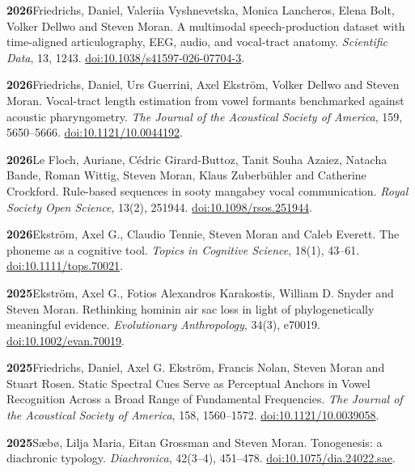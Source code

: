 \documentclass[11pt]{article}
\newcommand{\hangpara}{
 \setlength{\parindent}{0in} %
 \hangindent=0.42in %
}
\begin{document}
\vskip 6pt
\hangpara
{\bf 2026}\hspace{1ex}Friedrichs, Daniel, Valeriia Vyshnevetska, Monica Lancheros, Elena Bolt, Volker Dellwo and Steven Moran. A multimodal speech-production dataset with time-aligned articulography, EEG, audio, and vocal-tract anatomy. \textit{Scientific Data}, 13, 1243. \href{https://doi.org/10.1038/s41597-026-07704-3}{doi:10.1038/s41597-026-07704-3}.

\vskip 6pt
\hangpara
{\bf 2026}\hspace{1ex}Friedrichs, Daniel, Urs Guerrini, Axel Ekström, Volker Dellwo and Steven Moran. Vocal-tract length estimation from vowel formants benchmarked against acoustic pharyngometry. \textit{The Journal of the Acoustical Society of America}, 159, 5650--5666. \href{https://doi.org/10.1121/10.0044192}{doi:10.1121/10.0044192}.

\vskip 6pt
\hangpara
{\bf 2026}\hspace{1ex}Le Floch, Auriane, Cédric Girard-Buttoz, Tanit Souha Azaiez, Natacha Bande, Roman Wittig, Steven Moran, Klaus Zuberbühler and Catherine Crockford. Rule-based sequences in sooty mangabey vocal communication. \textit{Royal Society Open Science}, 13(2), 251944. \href{https://doi.org/10.1098/rsos.251944}{doi:10.1098/\allowbreak rsos.251944}.

\vskip 6pt
\hangpara
{\bf 2026}\hspace{1ex}Ekström, Axel G., Claudio Tennie, Steven Moran and Caleb Everett. The phoneme as a cognitive tool. \textit{Topics in Cognitive Science}, 18(1), 43--61. \href{https://doi.org/10.1111/tops.70021}{doi:10.1111/tops.70021}.

\vskip 6pt
\hangpara
{\bf 2025}\hspace{1ex}Ekström, Axel G., Fotios Alexandros Karakostis, William D. Snyder and Steven Moran. Rethinking hominin air sac loss in light of phylogenetically meaningful evidence. \textit{Evolutionary Anthropology}, 34(3), e70019. \href{https://doi.org/10.1002/evan.70019}{doi:10.1002/evan.70019}.

\vskip 6pt
\hangpara
{\bf 2025}\hspace{1ex}Friedrichs, Daniel, Axel G. Ekström, Francis Nolan, Steven Moran and Stuart Rosen. Static Spectral Cues Serve as Perceptual Anchors in Vowel Recognition Across a Broad Range of Fundamental Frequencies. \textit{The Journal of the Acoustical Society of America}, 158, 1560--1572. \href{https://doi.org/10.1121/10.0039058}{doi:10.1121/10.0039058}.

\vskip 6pt
\hangpara
{\bf 2025}\hspace{1ex}Sæbø, Lilja Maria, Eitan Grossman and Steven Moran. Tonogenesis: a diachronic typology. \textit{Diachronica}, 42(3--4), 451--478. \href{https://doi.org/10.1075/dia.24022.sae}{doi:10.1075/dia.24022.sae}.
\end{document}

